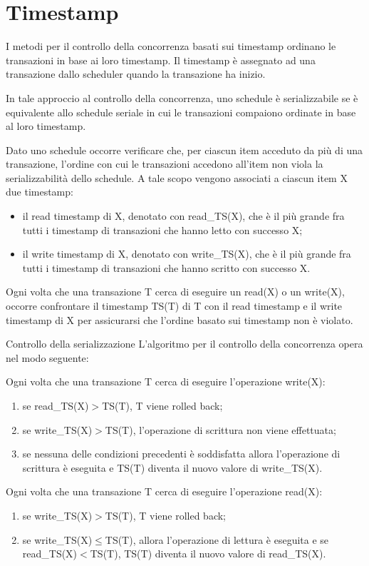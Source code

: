 \section{Timestamp}
I metodi per il controllo della concorrenza basati sui timestamp ordinano le transazioni in base ai loro timestamp. Il timestamp è assegnato ad una transazione dallo scheduler quando la transazione ha inizio.

In tale approccio al controllo della concorrenza, uno schedule è serializzabile se è equivalente allo schedule seriale in cui le transazioni compaiono ordinate in base al loro timestamp.

Dato uno schedule occorre verificare che, per ciascun item acceduto da più di una transazione, l’ordine con cui le transazioni accedono all’item non viola la serializzabilità dello schedule. A tale scopo vengono associati a ciascun item X due timestamp:
\begin{itemize}
    \item il read timestamp di X, denotato con read\_TS(X), che è il più grande fra tutti i timestamp di transazioni che hanno letto con successo X;
    \item il write timestamp di X, denotato con write\_TS(X), che è il più grande fra tutti i timestamp di transazioni che hanno scritto con successo X.
\end{itemize}

Ogni volta che una transazione T cerca di eseguire un read(X) o un write(X), occorre confrontare il timestamp TS(T) di T con il read timestamp e il write timestamp di X per assicurarsi che l’ordine basato sui timestamp non è violato. 

\begin{Algoritmo}{Controllo della serializzazione}{}
    L’algoritmo per il controllo della concorrenza opera nel modo seguente:
    
    Ogni volta che una transazione T cerca di eseguire l’operazione write(X):
    \begin{enumerate}
        \item se read\_TS(X)$>$TS(T), T viene rolled back;
    \item se write\_TS(X)$>$TS(T), l’operazione di scrittura non viene effettuata;
    \item se nessuna delle condizioni precedenti è soddisfatta allora l’operazione di scrittura è eseguita e TS(T) diventa il nuovo valore di write\_TS(X).
    \end{enumerate}
    
    Ogni volta che una transazione T cerca di eseguire l’operazione read(X):
    \begin{enumerate}
        \item se write\_TS(X)$>$TS(T), T viene rolled back;
        \item se write\_TS(X)$\leq$TS(T), allora l’operazione di lettura è eseguita e se read\_TS(X)$<$TS(T), TS(T) diventa il nuovo valore di read\_TS(X).
    \end{enumerate}
\end{Algoritmo}


